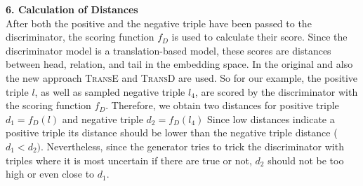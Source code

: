 \textbf{6. Calculation of Distances}\\
%
After both the positive and the negative triple have been passed to the discriminator, the scoring function $f_D$ is used to calculate their score.
Since the discriminator model is a translation-based model, these scores are distances between head, relation, and tail in the embedding space.
In the original \kbgan and also the new \usgan approach \textsc{TransE} and \textsc{TransD} are used.
So for our example, the positive triple $l$, as well as sampled negative triple $l_4$, are scored by the discriminator with the scoring function $f_D$.
Therefore, we obtain two distances for positive triple $d_1 = f_D(l)$ and negative triple $d_2 = f_D(l_4)$
Since low distances indicate a positive triple its distance should be lower than the negative triple distance ($d_1 < d_2)$.
Nevertheless, since the generator tries to trick the discriminator with triples where it is most uncertain if there are true or not, $d_2$ should not be too high or even close to $d_1$.
